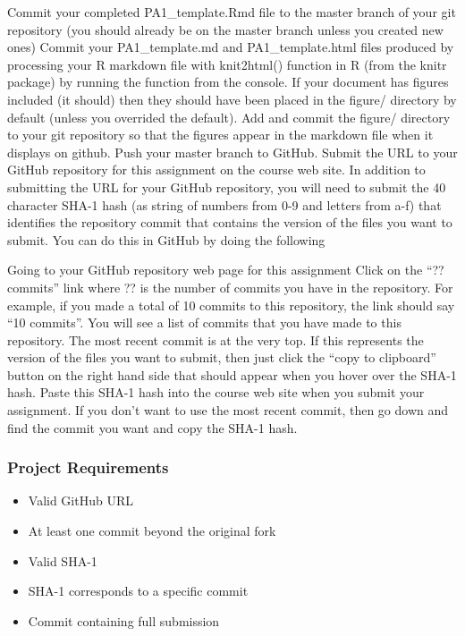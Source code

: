 \documentclass[]{article}
\providecommand{\tightlist}{%
  \setlength{\itemsep}{0pt}\setlength{\parskip}{0pt}}
\begin{document}
Commit your completed
\color{red}{\verb|PA1_template.Rmd|}PA1\_template.Rmd file to the
\color{red}{\verb|master|}master branch of your git repository (you
should already be on the \color{red}{\verb|master|}master branch unless
you created new ones) Commit your PA1\_template.md and
PA1\_template.html files produced by processing your R markdown file
with knit2html() function in R (from the knitr package) by running the
function from the console. If your document has figures included (it
should) then they should have been placed in the figure/ directory by
default (unless you overrided the default). Add and commit the figure/
directory to your git repository so that the figures appear in the
markdown file when it displays on github. Push your
\color{red}{\verb|master|}master branch to GitHub. Submit the URL to
your GitHub repository for this assignment on the course web site. In
addition to submitting the URL for your GitHub repository, you will need
to submit the 40 character SHA-1 hash (as string of numbers from 0-9 and
letters from a-f) that identifies the repository commit that contains
the version of the files you want to submit. You can do this in GitHub
by doing the following

Going to your GitHub repository web page for this assignment Click on
the ``?? commits'' link where ?? is the number of commits you have in
the repository. For example, if you made a total of 10 commits to this
repository, the link should say ``10 commits''. You will see a list of
commits that you have made to this repository. The most recent commit is
at the very top. If this represents the version of the files you want to
submit, then just click the ``copy to clipboard'' button on the right
hand side that should appear when you hover over the SHA-1 hash. Paste
this SHA-1 hash into the course web site when you submit your
assignment. If you don't want to use the most recent commit, then go
down and find the commit you want and copy the SHA-1 hash.

\subsubsection{Project Requirements}\label{project-requirements}

\begin{itemize}
\tightlist
\item
  Valid GitHub URL
\item
  At least one commit beyond the original fork
\item
  Valid SHA-1
\item
  SHA-1 corresponds to a specific commit
\item
  Commit containing full submission
\end{itemize}
\end{document}
